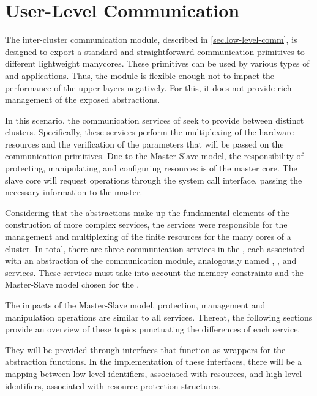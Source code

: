 	\section{User-Level Communication}
	\label{sec.user-level-comm}

		The inter-cluster communication module, described in \autoref{sec.low-level-comm},
		is designed to export a standard and straightforward communication
		primitives to different lightweight manycores.
		These primitives can be used by various types of \oss and applications.
		Thus, the module is flexible enough not to impact the performance
		of the upper layers negatively.
		For this, it does not provide rich management of the exposed abstractions.

		In this scenario, the communication services of \nanvix \microkernel seek
		to provide \ipc between distinct clusters.
		Specifically, these services perform the multiplexing of the hardware
		resources and the verification of the parameters that will be passed
		on the communication primitives.
		Due to the Master-Slave model, the responsibility of protecting,
		manipulating, and configuring \hal resources is of the master core.
		The slave core will request operations through the system call interface,
		passing the necessary information to the master.

		Considering that the abstractions make up the fundamental elements of
		the construction of more complex services, the \microkernel services
		were responsible for the management and multiplexing of the finite
		resources for the many cores of a cluster.
		In total, there are three communication services in the \nanvix \microkernel,
		each associated with an abstraction of the communication module,
		analogously named \sync, \mailbox, and \portal services.
		These services must take into account the memory constraints and the
		Master-Slave model chosen for the \microkernel.

		The impacts of the Master-Slave model, protection, management and manipulation 
		operations are similar to all services.
		Thereat, the following sections provide an overview of these topics punctuating 
		the differences of each service.

		They will be provided through interfaces that function as wrappers
		for the \hal abstraction functions.
		In the implementation of these interfaces, there will be a mapping
		between low-level identifiers, associated with \hal resources,
		and high-level identifiers, associated with resource protection structures.

